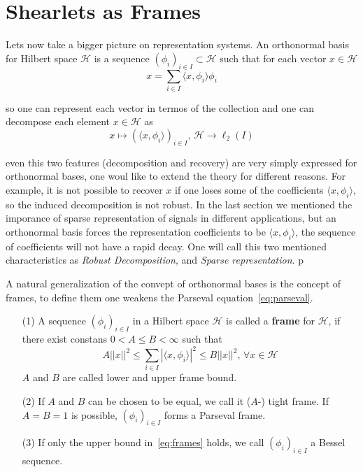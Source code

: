 \section{Shearlets as Frames}
\label{sec:ShearletsFrames}

Lets now take a bigger picture on representation systems. An orthonormal basis for Hilbert space $\mathcal{H}$ is a sequence $(\phi_i)_{i\in I}\subset\mathcal{H}$ such that for each vector $x\in\mathcal{H}$
\begin{equation}
\label{eq:parseval}
x=\sum_{i\in I}\langle x,\phi_i\rangle \phi_i
\end{equation}

so one can represent each vector in termos of the collection and one can decompose each element $x\in\mathcal{H}$ as
$$
x\mapsto (\langle x,\phi_i\rangle)_{i\in I}\text{,  }\mathcal{H}\longrightarrow \ell_2(I)
$$

even this two features (decomposition and recovery) are very simply expressed for orthonormal bases, one woul like to extend the theory for different reasons. For example, it is not possible to recover $x$ if one loses some of the coefficients $\langle x, \phi_i\rangle$, so the induced decomposition is not robust. In the last section we mentioned the imporance of sparse representation of signals in different applications, but an orthonormal basis forces the representation coefficients to be $\langle x,\phi_i\rangle$, the sequence of coefficients will not have a rapid decay. One will call this two mentioned characteristics as \textit{Robust Decomposition}, and \textit{Sparse representation}. 
p
\bigskip

A natural generalization of the convept of orthonormal bases is the concept of frames, to define them one weakens the Parseval equation~\ref{eq:parseval}.

\bigskip

\begin{defn}[Frames]
\label{def:frames}
\begin{enumerate}
\item[(1)] A sequence $(\phi_i)_{i\in I}$ in a Hilbert space $\mathcal{H}$ is called a \textbf{frame} for $\mathcal{H}$, if there exist constans $0<A\leq B<\infty$ such that
\begin{equation}
\label{eq:frames}
A||x||^2\leq \sum_{i\in I}|\langle x,\phi_i\rangle|^2\leq B||x||^2 \text{,  }\forall x\in \mathcal{H}
\end{equation}
$A$ and $B$ are called lower and upper frame bound.
\item[(2)] If $A$ and $B$ can be chosen to be equal, we call it ($A$-) tight frame. If $A=B=1$ is possible, $(\phi_i)_{i\in I}$ forms a Parseval frame.
\item[(3)] If only the upper bound in~\ref{eq:frames} holds, we call $(\phi_i)_{i\in I}$ a Bessel sequence.
\end{enumerate}
\end{defn}

